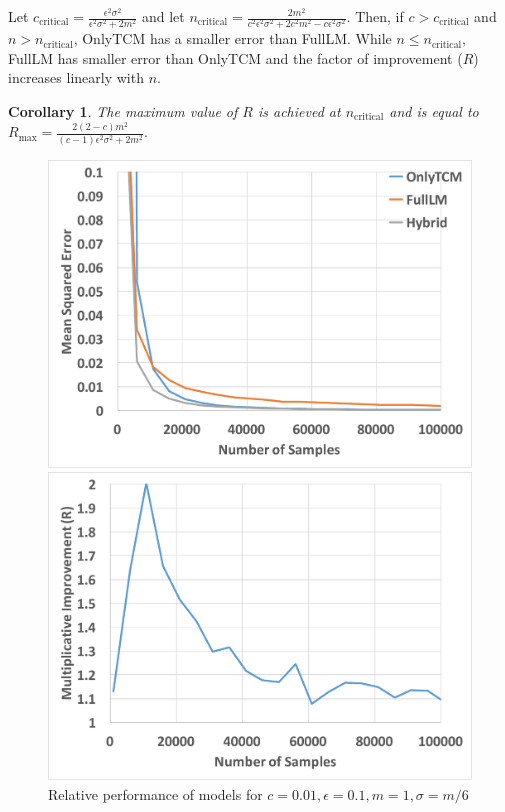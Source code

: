 \documentclass{article}
\theoremstyle{plain}
\newtheorem*{cor}{Corollary}
\begin{document}
Let $c_{\text{critical}} = \frac{\epsilon^2 \sigma^2}{\epsilon^2 \sigma^2+2 m^2}$ and let $n_{\text{critical}} = \frac{2 m^2}{c^2 \epsilon^2 \sigma^2+2 c^2 m^2-c \epsilon^2 \sigma^2}.$ Then, if $c>c_{\text{critical}}$ and $n > n_{\text{critical}}$, OnlyTCM has a smaller error than FullLM. While $n \leq n_{\text{critical}}$, FullLM has smaller error than OnlyTCM and the factor of improvement ($R$) increases linearly with $n$. 

\begin{cor}
The maximum value of $R$ is achieved at $n_{\text{critical}}$ and is equal to $R_{\text{max}} = \frac{2 (2-c) m^2}{(c-1) \epsilon^2 \sigma^2+2 m^2}.$
\end{cor}

\begin{figure}[t]
\begin{minipage}[t]{.49\textwidth}
\includegraphics[width=0.99\linewidth]{eps01c01.pdf}
\caption{Relative performance of models for $c=0.01, \epsilon=0.1, m=1, \sigma = m/6$}
\end{minipage}
\begin{minipage}[t]{.49\textwidth}
\includegraphics[width=0.99\linewidth]{imp_eps01c01.pdf}

\end{minipage}
\end{figure}
\end{document}
